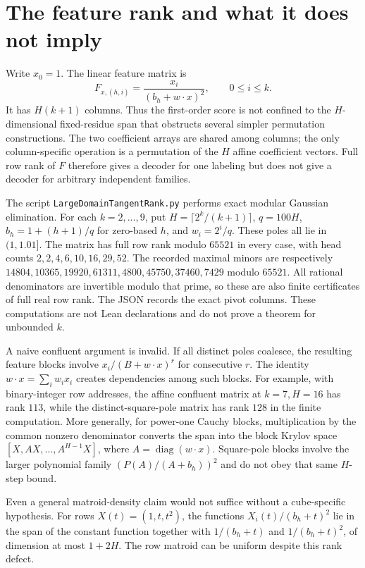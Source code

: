 \documentclass[11pt]{article}
\begin{document}
\section{The feature rank and what it does not imply}
Write $x_0=1$. The linear feature matrix is
\[
 F_{x,(h,i)}=\frac{x_i}{(b_h+w\cdot x)^2},\qquad 0\leq i\leq k.
\]
It has $H(k+1)$ columns. Thus the first-order score is not confined to the
$H$-dimensional fixed-residue span that obstructs several simpler
permutation constructions. The two coefficient arrays are shared among
columns; the only column-specific operation is a permutation of the $H$
affine coefficient vectors. Full row rank of $F$ therefore gives a decoder
for one labeling but does not give a decoder for arbitrary independent
families.

The script \texttt{LargeDomainTangentRank.py} performs exact modular
Gaussian elimination. For each $k=2,\ldots,9$, put
$H=\lceil 2^k/(k+1)\rceil$, $q=100H$,
$b_h=1+(h+1)/q$ for zero-based $h$, and $w_i=2^i/q$.
These poles all lie in $(1,1.01]$. The matrix has full row rank modulo
$65521$ in every case, with head counts
$2,2,4,6,10,16,29,52$. The recorded maximal minors are respectively
$14804,10365,19920,61311,4800,45750,37460,7429$ modulo $65521$.
All rational denominators are invertible modulo that prime, so these are
also finite certificates of full real row rank. The JSON records the exact
pivot columns. These computations are not Lean declarations and do not
prove a theorem for unbounded $k$.

A naive confluent argument is invalid. If all distinct poles coalesce,
the resulting feature blocks involve $x_i/(B+w\cdot x)^r$ for consecutive
$r$. The identity $w\cdot x=\sum_iw_ix_i$ creates dependencies among such
blocks. For example, with binary-integer row addresses, the affine
confluent matrix at $k=7,H=16$ has rank $113$, while the distinct-square-pole
matrix has rank $128$ in the finite computation.
More generally, for power-one Cauchy blocks, multiplication by the common
nonzero denominator converts the span into the block Krylov space
$[X,AX,\ldots,A^{H-1}X]$, where $A=\operatorname{diag}(w\cdot x)$.
Square-pole blocks involve the larger polynomial family
$(P(A)/(A+b_h))^2$ and do not obey that same $H$-step bound.

Even a general matroid-density claim would not suffice without a
cube-specific hypothesis. For rows $X(t)=(1,t,t^2)$, the functions
$X_i(t)/(b_h+t)^2$ lie in the span of the constant function together with
$1/(b_h+t)$ and $1/(b_h+t)^2$, of dimension at most $1+2H$.
The row matroid can be uniform despite this rank defect.
\end{document}
